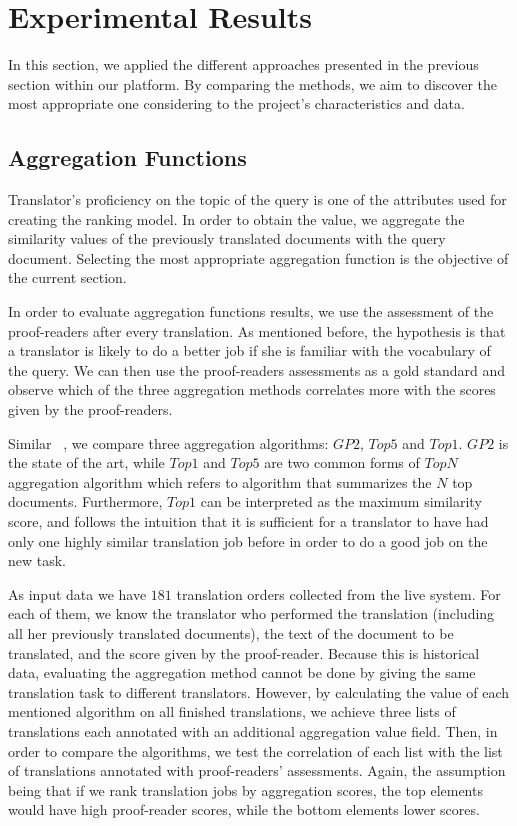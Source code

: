 \section{Experimental Results}
\label{sec:apply}
In this section, we applied the different approaches presented in the previous section within our platform. By comparing the methods, we aim to discover the most appropriate one considering to the project's characteristics and data.

\subsection{Aggregation Functions}
Translator's proficiency on the topic of the query is one of the attributes used for creating the ranking model. In order to obtain the value, we aggregate the similarity values of the previously translated documents with the query document. Selecting the most appropriate aggregation function is the objective of the current section.

In order to evaluate aggregation functions results, we use the assessment of the proof-readers after every translation. As mentioned before, the hypothesis is that a translator is likely to do a better job if she is familiar with the vocabulary of the query. We can then use the proof-readers assessments as a gold standard and observe which of the three aggregation methods correlates more with the scores given by the proof-readers. 

Similar ~\cite{agg-gp2}, we compare three aggregation algorithms: $GP2$, $Top5$ and $Top1$. $GP2$ is the state of the art, while $Top1$ and $Top5$ are two common forms of $TopN$ aggregation algorithm which refers to algorithm that summarizes the $N$ top documents. Furthermore, $Top1$ can be interpreted as the maximum similarity score, and follows the intuition that it is sufficient for a translator to have had only one highly similar translation job before in order to do a good job on the new task.

As input data we have $181$ translation orders collected from the live system. For each of them, we know the translator who performed the translation (including all her previously translated documents), the text of the document to be translated, and the score given by the proof-reader. Because this is historical data, evaluating the aggregation method cannot be done by giving the same translation task to different translators. However, by calculating the value of each mentioned algorithm on all finished translations, we achieve three lists of translations each annotated with an additional aggregation value field. Then, in order to compare the algorithms, we test the correlation of each list with the list of translations annotated with proof-readers' assessments. Again, the assumption being that if we rank translation jobs by aggregation scores, the top elements would have high proof-reader scores, while the bottom elements lower scores. 

